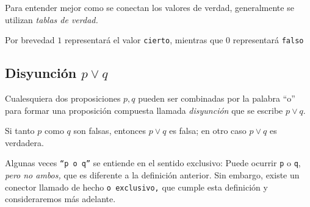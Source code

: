     \begin{rem}
        Para entender mejor como se conectan los valores de verdad, generalmente se utilizan \emph{tablas de verdad.}  
        
        Por brevedad $1$ representará el valor \texttt{cierto}, mientras que $0$ representará \texttt{falso}
    \end{rem}
    

\subsection{Disyunción $p \vee q$}


    Cualesquiera dos proposiciones $p,q$ pueden ser combinadas por la palabra ``o'' para formar una proposición compuesta llamada \emph{disyunción} que se escribe $p \vee q .$



    \begin{defn}
        Si tanto $p$ como $q$ son falsas, entonces $p \vee q$ es falsa; en otro caso $p\vee q$ es verdadera.
    \end{defn}
 \begin{rem}
  Algunas veces \texttt{``p o q''} se entiende en el sentido exclusivo: Puede ocurrir \texttt{p} o \texttt{q}, \emph{pero no ambos,} que es diferente a la definición anterior. Sin embargo, existe un conector llamado de hecho \texttt{o exclusivo,} que cumple esta definición y consideraremos más adelante. 
 \end{rem}



